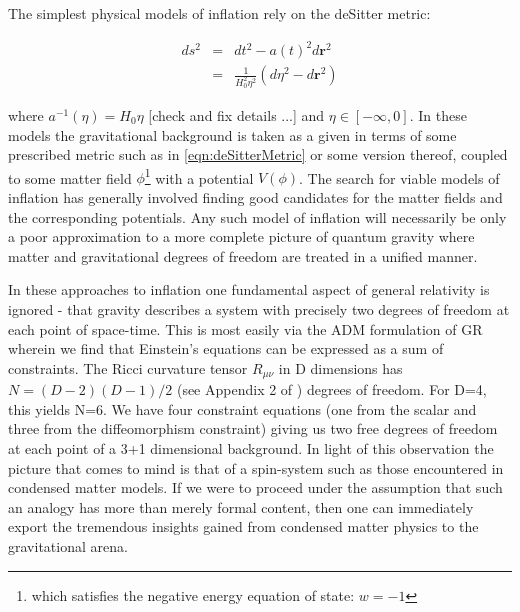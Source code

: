 \begin{doublespace}
The simplest physical models of inflation rely on the deSitter metric:

\begin{eqnarray}\label{eqn:deSitterMetric}
	ds^{2} & = & dt^{2} - a(t)^{2} d\mathbf{r}^{2} \nonumber \\
	           & = & \frac{1}{H_{0}^{2}\eta^{2}} ( d \eta^{2} - d \mathbf{r}^{2} )
\end{eqnarray} 

where $a^{-1}(\eta) = H_{0}\eta$ [check and fix details ...] and $\eta \in [-\infty,0]$. In these models the gravitational background is taken as a given in terms of some prescribed metric such as in \ref{eqn:deSitterMetric} or some version thereof, coupled to some matter field $\phi$\;\footnote{which satisfies the negative energy equation of state: $w=-1$} with a potential $V(\phi)$. The search for viable models of inflation has generally involved finding good candidates for the matter fields and the corresponding potentials. Any such model of inflation will necessarily be only a poor approximation to a more complete picture of quantum gravity where matter and gravitational degrees of freedom are treated in a unified manner.

In these approaches to inflation one fundamental aspect of general relativity is ignored - that gravity describes a system with precisely two degrees of freedom at each point of space-time. This is most easily via the ADM formulation of GR wherein we find that Einstein's equations can be expressed as a sum of constraints. The Ricci curvature tensor $R_{\mu\nu}$ in D dimensions has $N=(D-2)(D-1)/2$ (see Appendix 2 of \cite{Wald1984General}) degrees of freedom. For D=4, this yields N=6. We have four constraint equations (one from the scalar and three from the diffeomorphism constraint) giving us two free degrees of freedom at each point of a 3+1 dimensional background. In light of this observation the picture that comes to mind is that of a spin-system such as those encountered in condensed matter models. If we were to proceed under the assumption that such an analogy has more than merely formal content, then one can immediately export the tremendous insights gained from condensed matter physics to the gravitational arena.


\end{doublespace}
